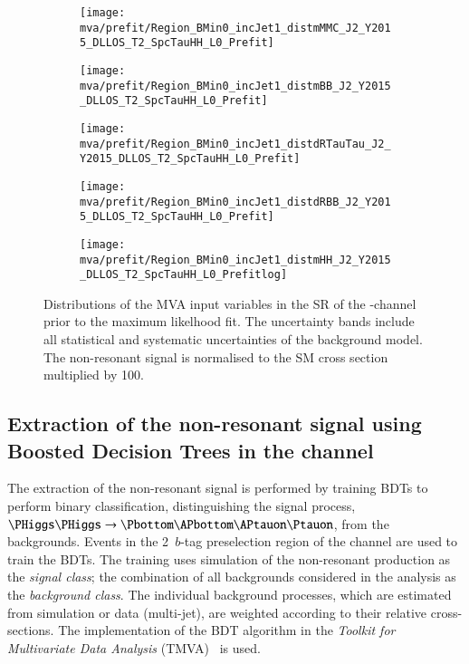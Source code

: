 \begin{figure}[htbp]
  \centering

  \begin{subfigure}[t]{.48\textwidth}
    \texttt{[image: mva/prefit/Region\_BMin0\_incJet1\_distmMMC\_J2\_Y2015\_DLLOS\_T2\_SpcTauHH\_L0\_Prefit]}
  \end{subfigure}\hfill %
  \begin{subfigure}[t]{.48\textwidth}
    \texttt{[image: mva/prefit/Region\_BMin0\_incJet1\_distmBB\_J2\_Y2015\_DLLOS\_T2\_SpcTauHH\_L0\_Prefit]}
  \end{subfigure}

  \begin{subfigure}[t]{.48\textwidth}
    \texttt{[image: mva/prefit/Region\_BMin0\_incJet1\_distdRTauTau\_J2\_Y2015\_DLLOS\_T2\_SpcTauHH\_L0\_Prefit]}
  \end{subfigure}\hfill %
  \begin{subfigure}[t]{.48\textwidth}
    \texttt{[image: mva/prefit/Region\_BMin0\_incJet1\_distdRBB\_J2\_Y2015\_DLLOS\_T2\_SpcTauHH\_L0\_Prefit]}
  \end{subfigure}

  \begin{subfigure}[t]{.48\textwidth}
    \texttt{[image: mva/prefit/Region\_BMin0\_incJet1\_distmHH\_J2\_Y2015\_DLLOS\_T2\_SpcTauHH\_L0\_Prefitlog]}
  \end{subfigure}

  \caption{Distributions of the MVA input variables in the SR of the
    \hadhad-channel prior to the maximum likelhood fit. The
    uncertainty bands include all statistical and systematic
    uncertainties of the background model. The non-resonant \HH signal
    is normalised to the SM cross section multiplied by 100.}
  \label{fig:mva_inputs}
\end{figure}


\subsection{Extraction of the non-resonant signal using Boosted
  Decision Trees in the \hadhad channel}
\label{sec:mva_smbdt}

The extraction of the non-resonant \HH signal is performed by training
BDTs to perform binary classification, distinguishing the signal
process, $\HH \to \bbtautau$, from the backgrounds. Events in the
2~$b$-tag preselection region of the \hadhad channel are used to train
the BDTs. The training uses simulation of the non-resonant \HH
production as the \emph{signal class}; the combination of all
backgrounds considered in the analysis as the \emph{background class}.
The individual background processes, which are estimated from
simulation or data (multi-jet), are weighted according to their
relative cross-sections. The implementation of the BDT algorithm in
the \emph{Toolkit for Multivariate Data Analysis}
(TMVA)~\cite{Hocker:2007ht} is used.

